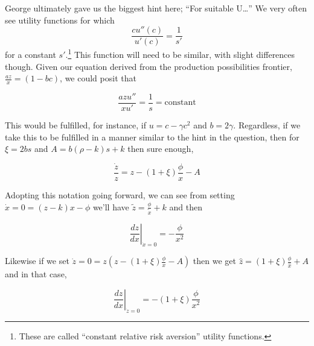 \documentclass[
]{article}
\begin{document}
George ultimately gave us the biggest hint here; ``For suitable
U\ldots{}'' We very often see utility functions for which
\[\frac{cu''(c)}{u'(c)} = \frac{1}{s'}\] for a constant
\(s'\).\footnote{These are called ``constant relative risk aversion''
  utility functions.} This function will need to be similar, with slight
differences though. Given our equation derived from the production
possibilities frontier, \(\frac{az}{x} = (1-bc)\), we could posit that

\[ \frac{azu''}{xu'} = \frac{1}{s} = \text{constant}\]

This would be fulfilled, for instance, if \(u = c - \gamma c^2\) and
\(b = 2\gamma\). Regardless, if we take this to be fulfilled in a manner
similar to the hint in the question, then for \(\xi = 2bs\) and
\(A=b(\rho - k)s + k\) then sure enough,

\[\frac{\dot{z}}{z} = z - (1+\xi)\frac{\phi}{x} - A\]

Adopting this notation going forward, we can see from setting
\(\dot{x} = 0 = (z - k)x - \phi\) we'll have
\(\tilde{z}= \frac{\phi}{\tilde{x}} + k\) and then

\[ \left. \frac{dz}{dx} \right\rvert_{\dot{x} = 0} = -\frac{\phi}{x^2}\]

Likewise if we set \(\dot{z} = 0 = z(z - (1+\xi)\frac{\phi}{x} - A)\)
then we get \(\hat{z}= (1+\xi)\frac{\phi}{\hat{x}} + A\) and in that
case,

\[ \left. \frac{dz}{dx} \right\rvert_{\dot{z} = 0} = -(1+\xi)\frac{\phi}{x^2}\]
\end{document}
